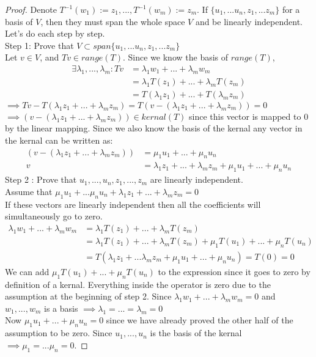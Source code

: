 \begin{proof}
	Denote $T^{-1}(w_1) := z_1,...,T^{-1}(w_m) := z_m$. If $\{u_1,...u_n,z_1,...z_m\}$ for a basis of $V$, then they must span the whole space $V$ and be linearly independent. Let's do each step by step. \\
	Step 1: Prove that $V \subset span\{u_1,...u_n,z_1,...z_m\}$ \\ 
	Let $v \in V$, and $Tv \in range(T)$. Since we know the basis of $range(T)$,
	\begin{align*}
		\exists \lambda_1,...,\lambda_m: Tv &= \lambda_1 w_1 + ... + \lambda_m w_m \\
											&= \lambda_1 T(z_1) + ... + \lambda_m T(z_m) \\
											&= T(\lambda_1 z_1) + ... + T(\lambda_m z_m)
	\end{align*}
$ \implies Tv - T(\lambda_1z_1 + ... + \lambda_mz_m) = T(v - (\lambda_1z_1 + ... + \lambda_mz_m)) =  0$  \\
$\implies (v - (\lambda_1z_1 + ... + \lambda_mz_m)) \in kernal(T)$ since this vector is mapped to 0 by the linear mapping. Since we also know the basis of the kernal any vector in the kernal can be written as: 
\begin{align*}
(v - (\lambda_1z_1 + ... + \lambda_mz_m)) &= \mu_1 u_1 + ... + \mu_n u_n \\ 
v &= \lambda_1 z_1 + ... + \lambda_m z_m + \mu_1 u_1 + ... + \mu_n u_n
\end{align*}
Step 2 : Prove that $u_1,...,u_n, z_1,...,z_m$ are linearly independent. \\ 
Assume that $\mu_1 u_1 + ... \mu_n u_n + \lambda_1 z_1 + ... + \lambda_m z_m  = 0$ \\
If these vectors are linearly independent then all the coefficients will simultaneously go to zero. 
\begin{align*}
	\lambda_1 w_1 + ... + \lambda_m w_m &= \lambda_1 T(z_1) + ... + \lambda_m T(z_m) \\
	&= \lambda_1 T(z_1) + ... + \lambda_m T(z_m) + \mu_1 T(u_1) + ... + \mu_n T(u_n) \\ 
	&= T(\lambda_1 z_1 + ... \lambda_m z_m + \mu_1 u_1 + ... + \mu_n u_n) = T(0) = 0
\end{align*}
We can add $ \mu_1 T(u_1) + ... + \mu_n T(u_n)$ to the expression since it goes to zero by definition of a kernal. Everything inside the operator is zero due to the assumption at the beginning of step 2. 
Since $\lambda_1 w_1 + ... + \lambda_m w_m = 0$ and $w_1,...,w_m$ is a basis 
$\implies \lambda_1 = ... = \lambda_m = 0$ \\
Now $\mu_1 u_1 + ... + \mu_n u_n = 0$ since we have already proved the other half of the assumption to be zero. Since $u_1,...,u_n$ is the basis of the kernal $\implies \mu_1=...\mu_n=0$.
\end{proof}


